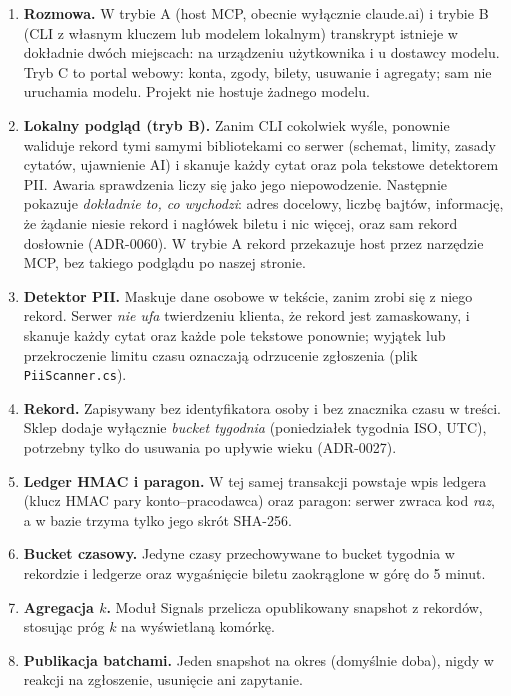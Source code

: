 \begin{enumerate}[leftmargin=*]
    \item \textbf{Rozmowa.} W trybie A (host MCP, obecnie wyłącznie
    claude.ai) i trybie B (CLI z własnym kluczem lub modelem lokalnym)
    transkrypt istnieje w dokładnie dwóch miejscach: na urządzeniu
    użytkownika i u dostawcy modelu. Tryb C to portal webowy: konta, zgody,
    bilety, usuwanie i agregaty; sam nie uruchamia modelu. Projekt nie
    hostuje żadnego modelu.
    \item \textbf{Lokalny podgląd (tryb B).} Zanim CLI cokolwiek wyśle,
    ponownie waliduje rekord tymi samymi bibliotekami co serwer (schemat,
    limity, zasady cytatów, ujawnienie AI) i skanuje każdy cytat oraz pola
    tekstowe detektorem PII. Awaria sprawdzenia liczy się jako jego
    niepowodzenie. Następnie pokazuje \emph{dokładnie to, co wychodzi}:
    adres docelowy, liczbę bajtów, informację, że żądanie niesie rekord i
    nagłówek biletu i nic więcej, oraz sam rekord dosłownie (ADR-0060).
    W trybie A rekord przekazuje host przez narzędzie MCP, bez takiego
    podglądu po naszej stronie.
    \item \textbf{Detektor PII.} Maskuje dane osobowe w tekście, zanim zrobi
    się z niego rekord. Serwer \emph{nie ufa} twierdzeniu klienta, że
    rekord jest zamaskowany, i skanuje każdy cytat oraz każde pole
    tekstowe ponownie; wyjątek lub przekroczenie limitu czasu oznaczają
    odrzucenie zgłoszenia (plik \texttt{PiiScanner.cs}).
    \item \textbf{Rekord.} Zapisywany bez identyfikatora osoby i bez
    znacznika czasu w treści. Sklep dodaje wyłącznie \emph{bucket tygodnia}
    (poniedziałek tygodnia ISO, UTC), potrzebny tylko do usuwania po
    upływie wieku (ADR-0027).
    \item \textbf{Ledger HMAC i paragon.} W tej samej transakcji powstaje
    wpis ledgera (klucz HMAC pary konto--pracodawca) oraz paragon: serwer
    zwraca kod \emph{raz}, a w bazie trzyma tylko jego skrót SHA-256.
    \item \textbf{Bucket czasowy.} Jedyne czasy przechowywane to bucket
    tygodnia w rekordzie i ledgerze oraz wygaśnięcie biletu zaokrąglone w
    górę do 5 minut.
    \item \textbf{Agregacja $k$.} Moduł Signals przelicza opublikowany
    snapshot z rekordów, stosując próg $k$ na wyświetlaną komórkę.
    \item \textbf{Publikacja batchami.} Jeden snapshot na okres
    (domyślnie doba), nigdy w reakcji na zgłoszenie, usunięcie ani
    zapytanie.
\end{enumerate}

